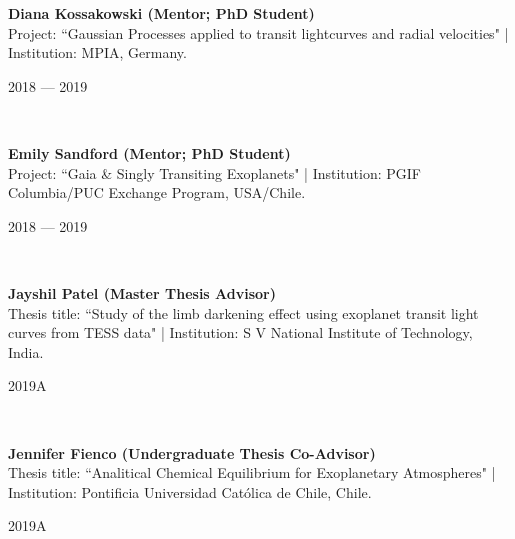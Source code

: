 \documentclass[12pt, a4paper]{article} %
\begin{document}
\begin{minipage}[t]{0.7\textwidth}
\begin{flushleft}%
  \setlength{\leftskip}{0.2cm}%
\textbf{Diana Kossakowski (Mentor; PhD Student)}\\
Project: ``Gaussian Processes applied to transit lightcurves and radial velocities" | Institution: MPIA, Germany.
\end{flushleft}
\end{minipage}
\begin{minipage}[t]{0.3\textwidth}
\hfill 2018 --- 2019
\end{minipage}\\

\begin{minipage}[t]{0.7\textwidth}
\begin{flushleft}%
  \setlength{\leftskip}{0.2cm}%
\textbf{Emily Sandford (Mentor; PhD Student)}\\
Project: ``Gaia \& Singly Transiting Exoplanets" | Institution: PGIF Columbia/PUC Exchange Program, USA/Chile.
\end{flushleft}
\end{minipage}
\begin{minipage}[t]{0.3\textwidth}
\hfill 2018 --- 2019
\end{minipage}\\

\begin{minipage}[t]{0.7\textwidth}
\begin{flushleft}%
  \setlength{\leftskip}{0.2cm}%
\textbf{Jayshil Patel (Master Thesis Advisor)}\\
Thesis title: ``Study of the limb darkening effect using exoplanet transit light curves from TESS data" | Institution: S V National Institute of Technology, India.
\end{flushleft}
\end{minipage}
\begin{minipage}[t]{0.3\textwidth}
\hfill 2019A
\end{minipage}\\

\begin{minipage}[t]{0.7\textwidth}
\begin{flushleft}%
  \setlength{\leftskip}{0.2cm}%
\textbf{Jennifer Fienco (Undergraduate Thesis Co-Advisor)}\\
Thesis title: ``Analitical Chemical Equilibrium for Exoplanetary Atmospheres" | Institution: Pontificia Universidad Cat\'olica de Chile, Chile.
\end{flushleft}
\end{minipage}
\begin{minipage}[t]{0.3\textwidth}
\hfill 2019A
\end{minipage}\\
\end{document}
